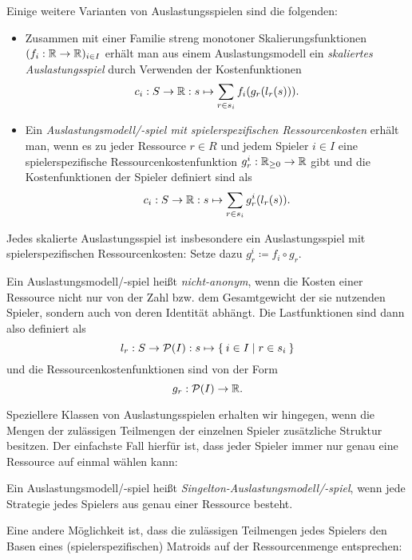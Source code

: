Einige weitere Varianten von Auslastungsspielen sind die folgenden:

\begin{defn}\label{def:weitereAuslastungsspiel}
	\begin{itemize}
		\item Zusammen mit einer Familie streng monotoner Skalierungsfunktionen $(f_i: \mathbb{R} \to \mathbb{R})_{i\in I}$ erhält man aus einem Auslastungsmodell ein \emph{skaliertes Auslastungsspiel} durch Verwenden der Kostenfunktionen
			\[c_i: S \to \mathbb{R}: s \mapsto \sum_{r \in s_i} f_i(g_r(l_r(s))). \]
		\item Ein \emph{Auslastungsmodell/-spiel mit spielerspezifischen Ressourcenkosten} erhält man, wenn es zu jeder Ressource $r \in R$ und jedem Spieler $i \in I$ eine spielerspezifische Ressourcenkostenfunktion $g_r^i: \mathbb{R}_{\geq 0} \to \mathbb{R}$ gibt und die Kostenfunktionen der Spieler definiert sind als
			\[c_i: S \to \mathbb{R}: s \mapsto \sum_{r \in s_i} g_r^i(l_r(s)).\]
	\end{itemize}
\end{defn}

\begin{bem}
	Jedes skalierte Auslastungsspiel ist insbesondere ein Auslastungsspiel mit spielerspezifischen Ressourcenkosten: Setze dazu $g_r^i \coloneqq f_i \circ g_r$.
\end{bem}

\begin{defn}
	Ein Auslastungsmodell/-spiel heißt \emph{nicht-anonym}, wenn die Kosten einer Ressource nicht nur von der Zahl bzw. dem Gesamtgewicht der sie nutzenden Spieler, sondern auch von deren Identität abhängt. Die Lastfunktionen sind dann also definiert als
		\[l_r: S \to \mathcal{P}(I): s \mapsto \Set{i \in I | r \in s_i }\]
	und die Ressourcenkostenfunktionen sind von der Form
		\[g_r: \mathcal{P}(I) \to \mathbb{R}. \]
\end{defn}

Speziellere Klassen von Auslastungsspielen erhalten wir hingegen, wenn die Mengen der zulässigen Teilmengen der einzelnen Spieler zusätzliche Struktur besitzen. Der einfachste Fall hierfür ist, dass jeder Spieler immer nur genau eine Ressource auf einmal wählen kann:

\begin{defn}
	Ein Auslastungsmodell/-spiel heißt \emph{Singelton-Auslastungsmodell/-spiel}, wenn jede Strategie jedes Spielers aus genau einer Ressource besteht.
\end{defn}

Eine andere Möglichkeit ist, dass die zulässigen Teilmengen jedes Spielers den Basen eines (spielerspezifischen) Matroids auf der Ressourcenmenge entsprechen:


